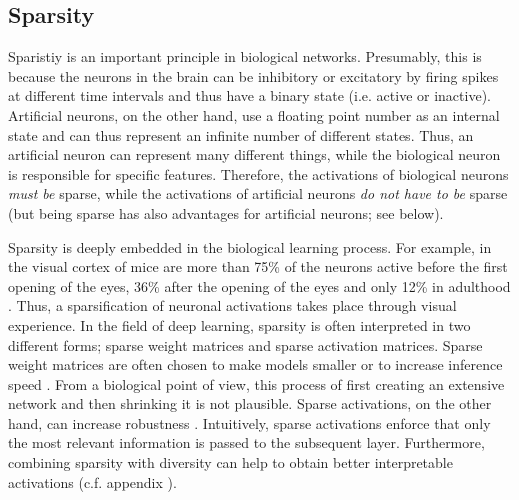 

\subsection{Sparsity}
Sparistiy is an important principle in biological networks.
Presumably, this is because the neurons in the brain can be inhibitory or excitatory by firing spikes at different time intervals and thus have a binary state (i.e. active or inactive). Artificial neurons, on the other hand, use a floating point number as an internal state and can thus represent an infinite number of different states.
Thus, an artificial neuron can represent many different things, while the biological neuron is responsible for specific features.
Therefore, the activations of biological neurons \emph{must be} sparse, while the activations of artificial neurons \emph{do not have to be} sparse (but being sparse has also advantages for artificial neurons; see below).

Sparsity is deeply embedded in the biological learning process.
For example, in the visual cortex of mice are more than 75\% of the neurons active before the first opening of the eyes, 36\% after the opening of the eyes and only 12\% in adulthood .
Thus, a sparsification of neuronal activations takes place through visual experience.
In the field of deep learning, sparsity is often interpreted in two different forms; sparse weight matrices and sparse activation matrices.
Sparse weight matrices are often chosen to make models smaller or to increase inference speed .
From a biological point of view, this process of first creating an extensive network and then shrinking it is not plausible.
Sparse activations, on the other hand, can increase robustness \cite{Panousis_Chatzis_Theodoridis_2021}.
Intuitively, sparse activations enforce that only the most relevant information is passed to the subsequent layer.
Furthermore, combining sparsity with diversity can help to obtain better interpretable activations (c.f. appendix ).

